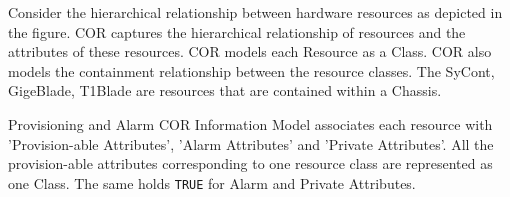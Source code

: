 Consider the hierarchical relationship between hardware resources as depicted in the figure. COR captures the hierarchical relationship of resources and the attributes of these resources. COR models each Resource as a Class. COR also models the containment relationship between the resource classes. The Sy\-Cont, Gige\-Blade, T1Blade are resources that are contained within a Chassis.

\begin{Desc}
\item[Provisioning and Alarm]COR Information Model associates each resource with 'Provision-able Attributes', 'Alarm Attributes' and 'Private Attributes'. All the provision-able attributes corresponding to one resource class are represented as one Class. The same holds {\tt TRUE} for Alarm and Private Attributes.\end{Desc}
